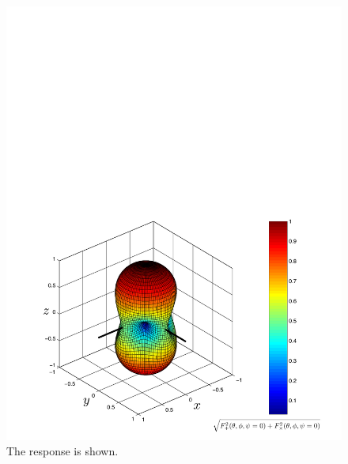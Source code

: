 \begin{figure}[p]
\begin{center}
\includegraphics[width=\linewidth]{figures/inspiral/beampattern}
\end{center}
\caption[Beam patter of an interferometric gravitational wave detector]{%
\label{f:beampattern}%
The response is shown.
}
\end{figure}


